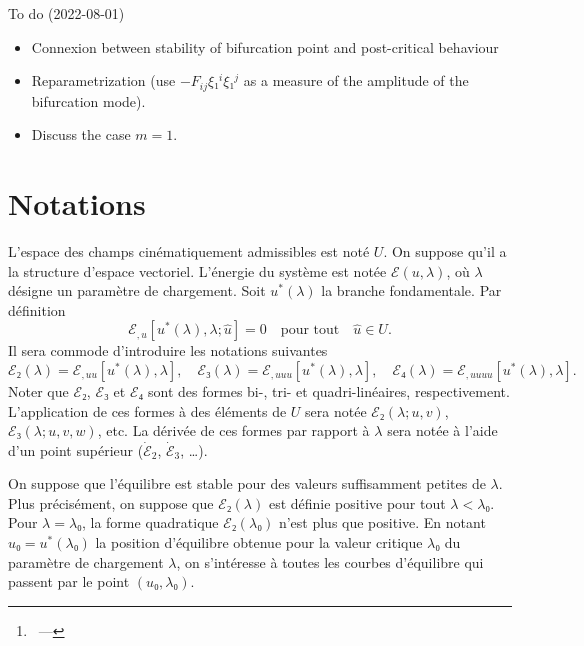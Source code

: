 \documentclass[12pt, final]{scrartcl}
\theoremstyle{definition}
\begin{document}
\title{\sbtitle}
\author{\sbauthor\thanks{\sbaddress~--- \sbemail}}
\maketitle

\begin{abstract}
 blabla
\end{abstract}

To do (2022-08-01)
\begin{itemize}
\item Connexion between stability of bifurcation point and post-critical behaviour
\item Reparametrization (use \(-F_{ij} ξ₁^i ξ₁^j\) as a measure of the amplitude
  of the bifurcation mode).
\item Discuss the case \(m = 1\).
\end{itemize}

\section{Notations}

L'espace des champs cinématiquement admissibles est noté \(U\). On suppose qu'il
a la structure d'espace vectoriel. L'énergie du système est notée \(ℰ(u, λ)\),
où \(λ\) désigne un paramètre de chargement. Soit \(u^{\ast}(λ)\) la branche
fondamentale. Par définition
\begin{equation}
  ℰ_{,u}[u^{\ast}(λ), λ; \hat{u}]=0 \quad \text{pour tout} \quad \hat{u}∈U.
\end{equation}
Il sera commode d'introduire les notations suivantes
\begin{equation}
  ℰ₂(λ) = ℰ_{,uu}[u^{\ast}(λ), λ], \quad ℰ₃(λ) = ℰ_{,uuu}[u^{\ast}(λ), λ], \quad ℰ₄(λ) = ℰ_{,uuuu} [u^{\ast}(λ), λ].
\end{equation}
Noter que \(ℰ₂\), \(ℰ₃\) et \(ℰ₄\) sont des formes bi-, tri- et
quadri-linéaires, respectivement. L'application de ces formes à des éléments de
\(U\) sera notée \(ℰ₂(λ; u, v)\), \(ℰ₃(λ; u, v, w)\), etc. La dérivée de ces
formes par rapport à \(λ\) sera notée à l'aide d'un point supérieur
(\(\dot{ℰ}_2\), \(\dot{ℰ}_3\), \dots).

On suppose que l'équilibre est stable pour des valeurs suffisamment petites de
\(λ\). Plus précisément, on suppose que \(ℰ₂(λ)\) est définie positive pour tout
\(λ < λ₀\). Pour \(λ = λ₀\), la forme quadratique \(ℰ₂(λ₀)\) n'est plus que
positive. En notant \(u₀ = u^{\ast}(λ₀)\) la position d'équilibre obtenue pour
la valeur critique \(λ₀\) du paramètre de chargement \(λ\), on s'intéresse à
toutes les courbes d'équilibre qui passent par le point \((u₀, λ₀)\).
\end{document}
